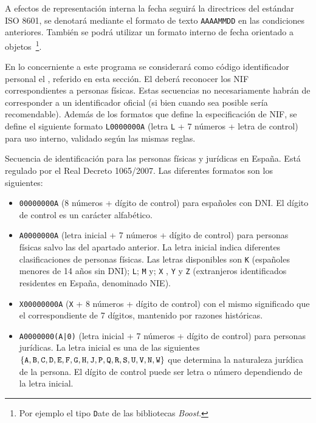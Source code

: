 \documentclass[11pt, a4paper, twoside, titlepage]{article}
\begin{document}
			A efectos de representación interna la fecha seguirá la directrices del estándar ISO 8601, se denotará mediante el formato de texto \verb|AAAAMMDD| en las condiciones anteriores. También se podrá utilizar un formato interno de fecha orientado a objetos~\footnote{Por ejemplo el tipo {\texttt Date} de las bibliotecas \textit{Boost}.}.

					En lo concerniente a este programa se considerará como código identificador personal el , referido en esta sección. El \software deberá reconocer los NIF correspondientes a personas físicas. Estas secuencias no necesariamente habrán de corresponder a un identificador oficial (si bien cuando sea posible sería recomendable). Además de los formatos que define la especificación de NIF, se define el siguiente formato \verb|L0000000A| (letra \verb|L| + 7 números + letra de control) para uso interno, validado según las mismas reglas. \label{srs:idpersonal}

				 \label{srs:nif}
					Secuencia de identificación para las personas físicas y jurídicas en España. Está regulado por el Real Decreto 1065/2007. Las diferentes formatos son los siguientes:

				\begin{itemize}
					\item \verb|00000000A| (8 números + dígito de control) para españoles con \gls{DNI}. El dígito de control es un carácter alfabético.
					\item \verb|A0000000A| (letra inicial + 7 números + dígito de control) para personas físicas salvo las del apartado anterior. La letra inicial indica diferentes clasificaciones de personas físicas. Las letras disponibles son \verb|K| (españoles menores de 14 años sin DNI); \verb|L|; \verb|M| y; \verb|X| , \verb|Y| y \verb|Z| (extranjeros identificados residentes en España, denominado \gls{NIE}).
					\item \verb|X00000000A| (\verb|X| + 8 números + dígito de control) con el mismo significado que el correspondiente de 7 dígitos, mantenido por razones históricas. 
					\item \verb:A0000000(A|0): (letra inicial + 7 números + dígito de control) para personas jurídicas. La letra inicial es una de las siguientes $\{ \verb|A|, \verb|B|, \verb|C|, \verb|D|, \verb|E|, \verb|F|, \verb|G|, \verb|H|, \verb|J|, \verb|P|, \verb|Q|, \verb|R|, \verb|S|, \verb|U|, \verb|V|, \verb|N|, \verb|W| \}$ que determina la naturaleza jurídica de la persona. El dígito de control puede ser letra o número dependiendo de la letra inicial.\\
				 \end{itemize}
				
\end{document}
